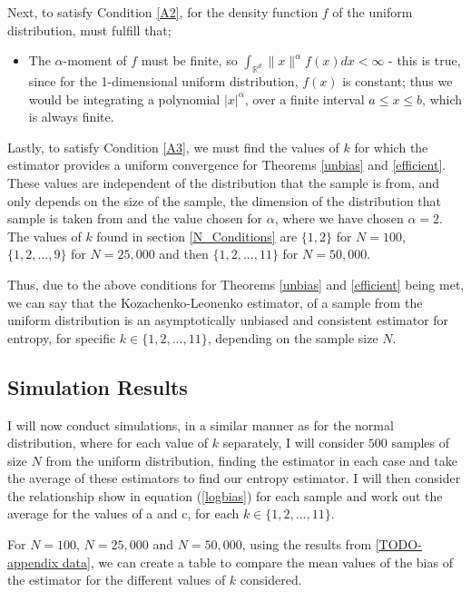 \documentclass{report}
\begin{document}
Next, to satisfy Condition \ref{A2}, for the density function $f$ of the uniform distribution, must fulfill that;
\begin{itemize}
\item The $\alpha$-moment of $f$ must be finite, so $\int_{\mathbb{R}^{d}} \| x \|^{\alpha} f(x) dx < \infty$ - this is true, since for the 1-dimensional uniform distribution, $f(x)$ is constant; thus we would be integrating a polynomial $|x|^{\alpha}$, over a finite interval $a \leq x \leq b$, which is always finite.
\end{itemize}

Lastly, to satisfy Condition \ref{A3}, we must find the values of $k$ for which the estimator provides a uniform convergence for Theorems \ref{unbias} and \ref{efficient}. These values are independent of the distribution that the sample is from, and only depends on the size of the sample, the dimension of the distribution that sample is taken from and the value chosen for $\alpha$, where we have chosen $\alpha = 2$. The values of $k$ found in section \ref{N_Conditions} are $\{1,2\}$ for $N=100$, $\{1, 2, ..., 9\}$ for $N=25,000$ and then $\{1, 2, ..., 11\}$ for $N=50,000$. 

Thus, due to the above conditions for Theorems \ref{unbias} and \ref{efficient} being met, we can say that the Kozachenko-Leonenko estimator, of a sample from the uniform distribution is an asymptotically unbiased and consistent estimator for entropy, for specific $k \in \{1, 2, ..., 11 \}$, depending on the sample size $N$.




\subsection{Simulation Results}

I will now conduct simulations, in a similar manner as for the normal distribution, where for each value of $k$ separately, I will consider $500$ samples of size $N$ from the uniform distribution, finding the estimator in each case and take the average of these estimators to find our entropy estimator. I will then consider the relationship show in equation (\ref{logbias}) for each sample and work out the average for the values of a and c, for each $k \in \{1, 2, ..., 11\}$. 

For $N=100$, $N=25,000$ and $N=50,000$, using the results from \ref{TODO-appendix data}, we can create a table to compare the mean values of the bias of the estimator for the different values of $k$ considered. 
\end{document}
